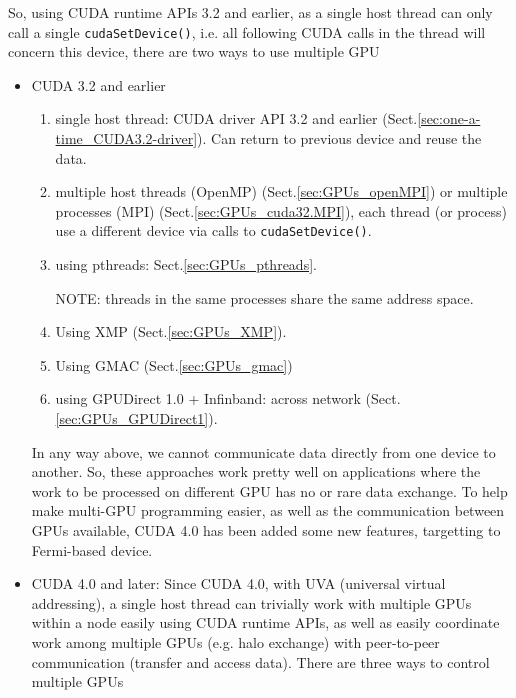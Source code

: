 So, using CUDA runtime APIs 3.2 and earlier, as a single host thread can only
call a single \verb!cudaSetDevice()!, i.e.
all following CUDA calls in the thread will concern this device, there are two
ways to use multiple GPU
\begin{itemize}
  \item CUDA 3.2 and earlier
\begin{enumerate}
  \item single host thread: CUDA driver API 3.2 and earlier
  (Sect.\ref{sec:one-a-time_CUDA3.2-driver}). Can return to previous device and
  reuse the data.
  
  \item multiple host threads (OpenMP) (Sect.\ref{sec:GPUs_openMPI}) or multiple
  processes (MPI) (Sect.\ref{sec:GPUs_cuda32.MPI}), each thread (or process) use a different device via calls to \verb!cudaSetDevice()!.  
  
  \item using pthreads: Sect.\ref{sec:GPUs_pthreads}. 
  
  
  NOTE: threads in the same processes share the same address space.
  
  \item Using XMP (Sect.\ref{sec:GPUs_XMP}).
%   
\item Using GMAC (Sect.\ref{sec:GPUs_gmac})

  \item using GPUDirect 1.0 + Infinband: across network
  (Sect.\ref{sec:GPUs_GPUDirect1}).
\end{enumerate}
In any way above, we cannot communicate data directly from one device to
another. So, these approaches work pretty well on applications where the work to
be processed on different GPU has no or rare data exchange. 
To help make multi-GPU programming easier, as well as the communication between
GPUs available, CUDA 4.0 has been added some new features, targetting to
Fermi-based device. 

\item CUDA 4.0 and later: Since CUDA 4.0, with UVA (universal virtual addressing), a
single host thread can trivially work with multiple GPUs within a node easily
using CUDA runtime APIs, as well as easily coordinate work among multiple GPUs
(e.g. halo exchange) with peer-to-peer communication (transfer and access data).
There are  three ways to control multiple GPUs 


\end{itemize}
